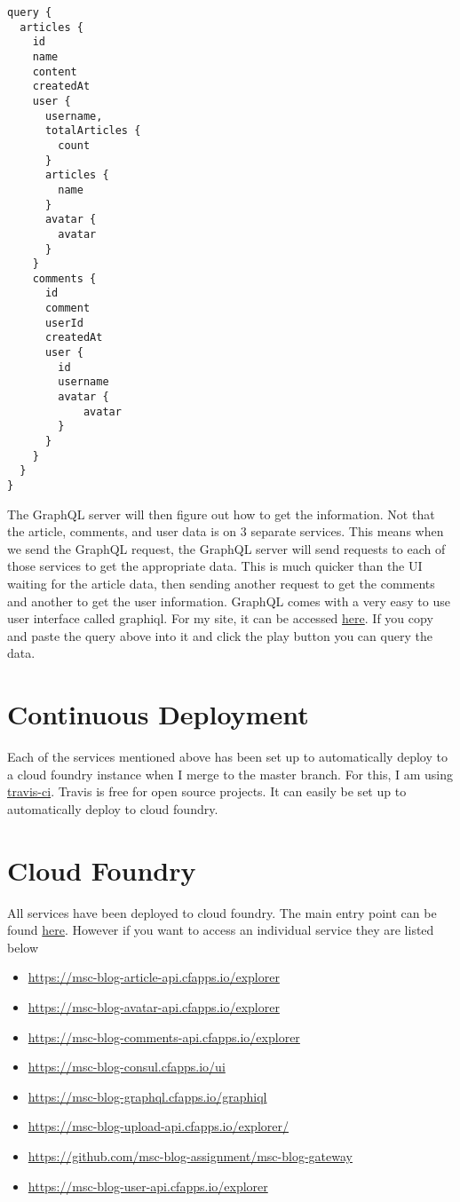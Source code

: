\begin{verbatim}
query {
  articles {
    id
    name
    content
    createdAt
    user {
      username,
      totalArticles {
        count
      }
      articles {
        name
      }
      avatar {
        avatar
      }
    }
    comments {
      id
      comment
      userId
      createdAt
      user {
        id
        username
        avatar {
            avatar
        }
      }
    }
  }
}
\end{verbatim}
The GraphQL server will then figure out how to get the information. Not that the article, comments, and user data is on 3 separate services. This means when we send the GraphQL request, the GraphQL server will send requests to each of those services to get the appropriate data. This is much quicker than the UI waiting for the article data, then sending another request to get the comments and another to get the user information.  GraphQL comes with a very easy to use user interface called graphiql. For my site, it can be accessed \href{https://msc-blog-gateway.cfapps.io/graphiql}{here}. If you copy and paste the query above into it and click the play button you can query the data.

\section{Continuous Deployment}

Each of the services mentioned above has been set up to automatically deploy to a cloud foundry instance when I merge to the master branch. For this, I am using \href{https://travis-ci.org/}{travis-ci}. Travis is free for open source projects. It can easily be set up to automatically deploy to cloud foundry.

\section{Cloud Foundry}

All services have been deployed to cloud foundry. The main entry point can be found \href{https://msc-blog-gateway.cfapps.io/}{here}. However if you want to access an individual service they are listed below

\begin{itemize}
  \item \url{https://msc-blog-article-api.cfapps.io/explorer}
  \item \url{https://msc-blog-avatar-api.cfapps.io/explorer}
  \item \url{https://msc-blog-comments-api.cfapps.io/explorer}
  \item \url{https://msc-blog-consul.cfapps.io/ui}
  \item \url{https://msc-blog-graphql.cfapps.io/graphiql}
  \item \url{https://msc-blog-upload-api.cfapps.io/explorer/}
  \item \url{https://github.com/msc-blog-assignment/msc-blog-gateway}
  \item \url{https://msc-blog-user-api.cfapps.io/explorer}
\end{itemize}

